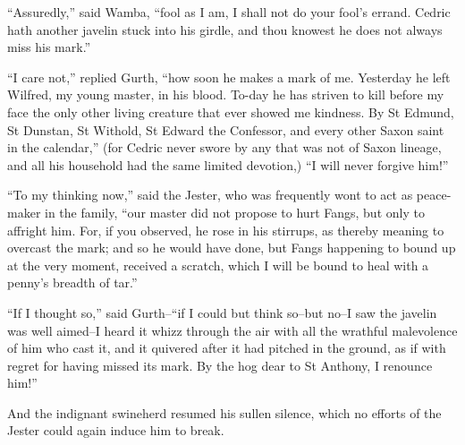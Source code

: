 ``Assuredly,'' said Wamba, ``fool as I am, I shall not do your fool's
errand. Cedric hath another javelin stuck into his girdle, and thou
knowest he does not always miss his mark.''

``I care not,'' replied Gurth, ``how soon he makes a mark of me.
Yesterday he left Wilfred, my young master, in his blood. To-day he has
striven to kill before my face the only other living creature that ever
showed me kindness. By St Edmund, St Dunstan, St Withold, St Edward the
Confessor, and every other Saxon saint in the calendar,'' (for Cedric
never swore by any that was not of Saxon lineage, and all his household
had the same limited devotion,) ``I will never forgive him!''

``To my thinking now,'' said the Jester, who was frequently wont to act
as peace-maker in the family, ``our master did not propose to hurt
Fangs, but only to affright him. For, if you observed, he rose in his
stirrups, as thereby meaning to overcast the mark; and so he would have
done, but Fangs happening to bound up at the very moment, received a
scratch, which I will be bound to heal with a penny's breadth of tar.''

``If I thought so,'' said Gurth--``if I could but think so--but no--I
saw the javelin was well aimed--I heard it whizz through the air with
all the wrathful malevolence of him who cast it, and it quivered after
it had pitched in the ground, as if with regret for having missed its
mark. By the hog dear to St Anthony, I renounce him!''

And the indignant swineherd resumed his sullen silence, which no efforts
of the Jester could again induce him to break.

